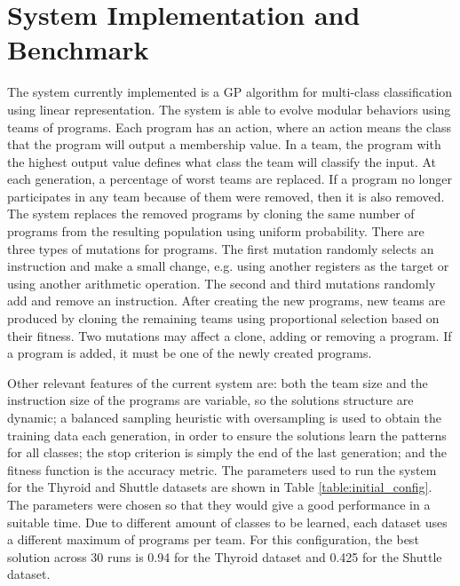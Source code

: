 \documentclass[journal]{IEEEtran}
\begin{document}
\section{System Implementation and Benchmark}
The system currently implemented is a GP algorithm for multi-class classification using linear representation. The system is able to evolve modular behaviors using teams of programs. Each program has an action, where an action means the class that the program will output a membership value. In a team, the program with the highest output value defines what class the team will classify the input. At each generation, a percentage of worst teams are replaced. If a program no longer participates in any team because of them were removed, then it is also removed. The system replaces the removed programs by cloning the same number of programs from the resulting population using uniform probability. There are three types of mutations for programs. The first  mutation randomly selects an instruction and make a small change, e.g. using another registers as the target or using another arithmetic operation. The second and third mutations randomly add and remove an instruction. After creating the new programs, new teams are produced by cloning the remaining teams using proportional selection based on their fitness. Two mutations may affect a clone, adding or removing a program. If a program is added, it must be one of the newly created programs.

Other relevant features of the current system are: both the team size and the instruction size of the programs are variable, so the solutions structure are dynamic; a balanced sampling heuristic with oversampling is used to obtain the training data each generation, in order to ensure the solutions learn the patterns for all classes; the stop criterion is simply the end of the last generation; and the fitness function is the accuracy metric. The parameters used to run the system for the Thyroid and Shuttle datasets are shown in Table \ref{table:initial_config}. The parameters were chosen so that they would give a good performance in a suitable time. Due to different amount of classes to be learned, each dataset uses a different maximum of programs per team. For this configuration, the best solution across 30 runs is 0.94 for the Thyroid dataset and 0.425 for the Shuttle dataset. 
\end{document}
